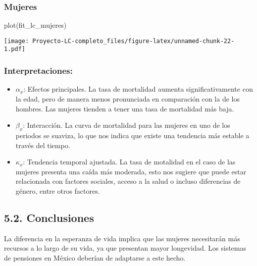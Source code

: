 \documentclass[
]{article}
\newenvironment{Shaded}{\begin{snugshade}}{\end{snugshade}}
\newcommand{\FunctionTok}[1]{\textcolor[rgb]{0.00,0.00,0.00}{#1}}
\newcommand{\NormalTok}[1]{#1}
\begin{document}
\clearpage

\hypertarget{mujeres}{%
\subsubsection{Mujeres}\label{mujeres}}

\begin{Shaded}
\begin{Highlighting}[]
\FunctionTok{plot}\NormalTok{(fit\_lc\_mujeres)}
\end{Highlighting}
\end{Shaded}

\texttt{[image: Proyecto-LC-completo\_files/figure-latex/unnamed-chunk-22-1.pdf]}

\hypertarget{interpretaciones-1}{%
\subsubsection{Interpretaciones:}\label{interpretaciones-1}}

\begin{itemize}
\item
  \(\alpha_x\): Efectos principales. La tasa de mortalidad aumenta
  significativamente con la edad, pero de manera menos pronunciada en
  comparación con la de los hombres. Las mujeres tienden a tener una
  tasa de mortalidad más baja.
\item
  \(\beta_x\): Interacción. La curva de mortalidad para las mujeres en
  uno de los periodos se suaviza, lo que nos indica que existe una
  tendencia más estable a través del tiempo.
\item
  \(\kappa_x\): Tendencia temporal ajustada. La tasa de motalidad en el
  caso de las mujeres presenta una caída más moderada, esto nos sugiere
  que puede estar relacionada con factores sociales, acceso a la salud o
  incluso diferencias de género, entre otros factores.
\end{itemize}

\clearpage

\hypertarget{conclusiones}{%
\subsection{5.2. Conclusiones}\label{conclusiones}}

La diferencia en la esperanza de vida implica que las mujeres
necesitarán más recursos a lo largo de su vida, ya que presentan mayor
longevidad. Los sistemas de pensiones en México deberían de adaptarse a
este hecho.
\end{document}
